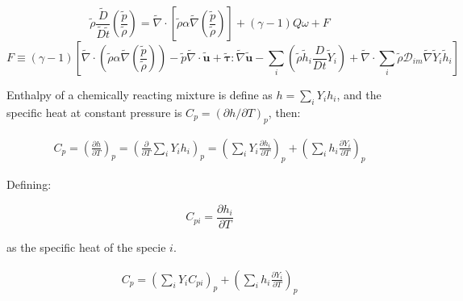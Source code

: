 \documentclass[preprint,12pt,authoryear]{elsarticle}
\begin{document}
{\begin{equation}
         \tilde{\rho}  
         \frac{\tilde{D} } {\tilde{D}\tilde{t} }
         (\frac{ \tilde{p}}{ \tilde{\rho}})
        = 
		\tilde{\nabla} \cdot 
			\left[ \tilde{\rho} \alpha
		\tilde{\nabla} (\frac{ \tilde{p} }{  \tilde{\rho} } )\right]
                +
        (\gamma - 1) Q \omega
        +
        F
\label{eqp}
\end{equation}
\begin{equation}
    F \equiv 
            (\gamma - 1)
        \left[
        \tilde{\nabla} \cdot 
		\left( 
		\tilde{\rho} \alpha
		\tilde{\nabla} (\frac{ \tilde{p} }{  \tilde{\rho} } )
		\right)
        -
        \tilde{p}  \tilde{\nabla} \cdot \tilde{\mathbf{u}}
		 +
        \pmb{\tilde{\tau}}:\tilde{\nabla} \tilde{\mathbf{u}} 
        -
        \sum\limits_i
        \left(
                 \tilde{\rho}\tilde{h}_i
                \frac{D}{Dt}
		\tilde{Y}_i
		\right)
        +
        \tilde{\nabla} \cdot
        \sum\limits_i 
        \tilde{\rho}\mathcal{D}_{im}\tilde{\nabla}\tilde{Y}_i     
        \tilde{h}_i
        \right]
\label{eqF}
\end{equation}
}





Enthalpy of a chemically reacting mixture  
is define as $h=\sum_iY_ih_i$, and 
the specific heat  at constant pressure is 
$C_p=\left(\partial{h}/\partial{T}\right)_p$,
then:

\begin{equation}
\begin{split}
C_p
=
\left(\frac{\partial{h}}{\partial{T}}\right)_p
=
\left(\frac{\partial}{\partial{T}}\sum_i Y_ih_i\right)_p
=
\left(\sum_i Y_i\frac{\partial{h_i}}{\partial{T}}\right)_p
+
\left(\sum_i h_i\frac{\partial{Y_i}}{\partial{T}}\right)_p
\end{split}
\end{equation}

Defining: 

\begin{equation}
C_{pi}=\frac{\partial{h_i}}{\partial{T}}
\end{equation}

as the specific heat of the specie $i$.

\begin{equation}
\begin{split}
C_p
=
\left(\sum_i Y_iC_{pi}\right)_p
+
\left(\sum_i h_i\frac{\partial{Y_i}}{\partial{T}}\right)_p
\end{split}
\end{equation}
\end{document}
